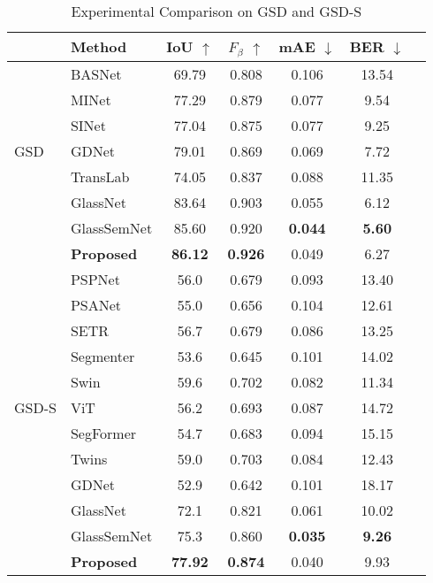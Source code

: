 \documentclass[10pt,twocolumn,letterpaper]{article}
\begin{document}
\begin{table}\scriptsize
    \centering
    \begin{tabular}{llccccc} %
    \toprule
    &Method & IoU $\uparrow$ &${F}_{\beta}$ $\uparrow$ & mAE $\downarrow$ &BER $\downarrow$ \\
    \midrule
    &BASNet\cite{qin2019basnet}  &69.79 &0.808 &0.106& 13.54 \\
    &MINet  \cite{pang2020multi}  &77.29 &0.879 &0.077& 9.54 \\
    
    &SINet \cite{fan2020camouflaged} &77.04 &0.875&0.077 & 9.25\\
    GSD &GDNet \cite{mei2020don}  &79.01 &0.869&0.069 &7.72  \\
    &TransLab\cite{xie2020segmenting} &74.05 & 0.837  &0.088  & 11.35\\
   & GlassNet \cite{lin2021rich}    &83.64 & 0.903 &0.055    & 6.12 \\
   & GlassSemNet\cite{linexploiting} &85.60 &0.920 &\textbf{0.044} &\textbf{5.60}\\
    \midrule
   & \textbf{Proposed} &\textbf{86.12} & \textbf{0.926} &0.049 & 6.27\\
    \midrule
        \midrule
   & PSPNet \cite{zhao2017pyramid}    &56.0 &0.679 &0.093& 13.40 \\
   & PSANet &55.0 &0.656 &0.104& 12.61 \\
   & SETR \cite{zhu2018bidirectional}  &56.7 &0.679    & 0.086 & 13.25\\
   & Segmenter \cite{yang2019my} &53.6 & 0.645 &0.101    & 14.02\\
   & Swin \cite{yang2019my}&59.6 & 0.702 &0.082    & 11.34\\
  GSD-S & ViT \cite{yang2019my} &56.2 &0.693    & 0.087 & 14.72\\
   & SegFormer \cite{yang2019my} &54.7 & 0.683 &0.094    & 15.15\\
   & Twins \cite{yang2019my} &59.0 & 0.703 &0.084    & 12.43\\
  &  GDNet \cite{mei2020don}&52.9 & 0.642 &0.101   & 18.17 \\
   & GlassNet \cite{lin2021rich}  &72.1 & 0.821 &0.061 & 10.02 \\
   & GlassSemNet \cite{linexploiting} &75.3&0.860 &\textbf{0.035}&\textbf{9.26}\\
    \midrule
   & \textbf{Proposed}& \textbf{77.92} &\textbf{0.874} & 0.040& 9.93 \\
    \bottomrule
    \end{tabular}
    \vspace*{-2mm}
    \caption{Experimental Comparison on GSD and GSD-S %
    }
    \vspace*{-2mm}
    \label{GSD}
\end{table}
\end{document}
